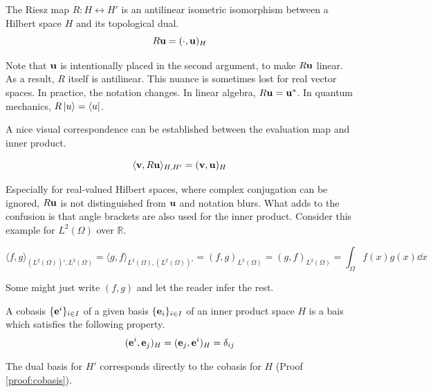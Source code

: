 \begin{definition}
	The Riesz map $R: H \leftrightarrow H'$ is an antilinear isometric isomorphism between a Hilbert space $H$ and its topological dual.
	\begin{equation}
		R \vb{u} = (\cdot, \vb{u})_{H}
	\end{equation}
\end{definition}

Note that $\vb{u}$ is intentionally placed in the second argument, to make $R \vb{u}$ linear. As a result, $R$ itself is antilinear. This nuance is sometimes lost for real vector spaces. In practice, the notation changes. In linear algebra, $R \vb{u} = \vb{u}^{*}$. In quantum mechanics, $R \ket{u} = \bra{u}$.

A nice visual correspondence can be established between the evaluation map and inner product.

\begin{equation}
	\langle \vb{v}, R \vb{u} \rangle_{H, H'} = (\vb{v}, \vb{u})_{H}
\end{equation}

Especially for real-valued Hilbert spaces, where complex conjugation can be ignored, $R\vb{u}$ is not distinguished from $\vb{u}$ and notation blurs. What adds to the confusion is that angle brackets are also used for the inner product. Consider this example for $L^{2}(\Omega)$ over $\mathbb{R}$.

\begin{equation*}
	\langle f, g \rangle_{(L^{2}(\Omega))', L^{2}(\Omega)} = \langle g, f \rangle_{L^{2}(\Omega), (L^{2}(\Omega))'} = (f, g)_{L^{2}(\Omega)} = (g, f)_{L^{2}(\Omega)} = \int_{\Omega} f(x) g(x) \dd{x}
\end{equation*}

Some might just write $(f, g)$ and let the reader infer the rest.

\begin{definition}[Cobasis]
	A cobasis $\{ \vb{e}^{i} \}_{i \in I}$ of a given basis $\{ \vb{e}_{i} \}_{i \in I}$ of an inner product space $H$ is a bais which satisfies the following property.
	\begin{equation}
		(\vb{e}^{i}, \vb{e}_{j})_{H} = (\vb{e}_{j}, \vb{e}^{i})_{H} = \delta_{ij}
	\end{equation}
\end{definition}

The dual basis for $H'$ corresponds directly to the cobasis for $H$ (Proof \ref{proof:cobasis}).

